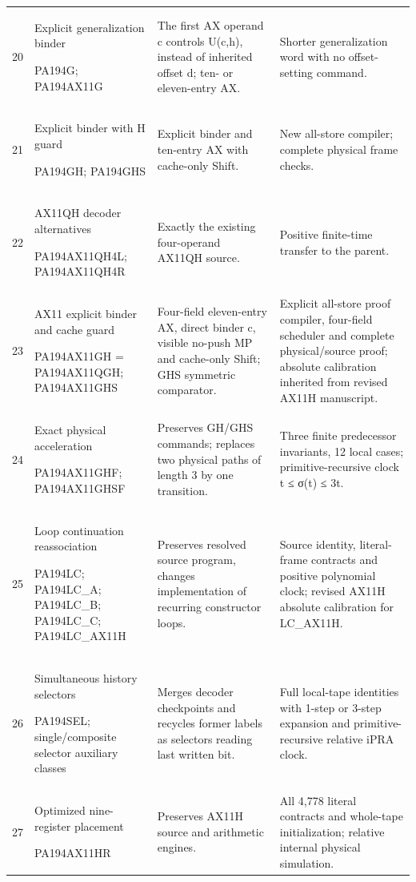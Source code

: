 \begin{longtable}{p{0.25in}>{\raggedright\arraybackslash}p{1.55in}>{\raggedright\arraybackslash}p{2.10in}>{\raggedright\arraybackslash}p{2.00in}}
20&Explicit generalization binder\par PA194G; PA194AX11G&The first AX operand c controls U(c,h), instead of inherited offset d; ten- or eleven-entry AX.&Shorter generalization word with no offset-setting command.\\[0.5em]
21&Explicit binder with H guard\par PA194GH; PA194GHS&Explicit binder and ten-entry AX with cache-only Shift.&New all-store compiler; complete physical frame checks.\\[0.5em]
22&AX11QH decoder alternatives\par PA194AX11QH4L; PA194AX11QH4R&Exactly the existing four-operand AX11QH source.&Positive finite-time transfer to the parent.\\[0.5em]
23&AX11 explicit binder and cache guard\par PA194AX11GH = PA194AX11QGH; PA194AX11GHS&Four-field eleven-entry AX, direct binder c, visible no-push MP and cache-only Shift; GHS symmetric comparator.&Explicit all-store proof compiler, four-field scheduler and complete physical/source proof; absolute calibration inherited from revised AX11H manuscript.\\[0.5em]
24&Exact physical acceleration\par PA194AX11GHF; PA194AX11GHSF&Preserves GH/GHS commands; replaces two physical paths of length 3 by one transition.&Three finite predecessor invariants, 12 local cases; primitive-recursive clock t ≤ σ(t) ≤ 3t.\\[0.5em]
25&Loop continuation reassociation\par PA194LC; PA194LC\_A; PA194LC\_B; PA194LC\_C; PA194LC\_AX11H&Preserves resolved source program, changes implementation of recurring constructor loops.&Source identity, literal-frame contracts and positive polynomial clock; revised AX11H absolute calibration for LC\_AX11H.\\[0.5em]
26&Simultaneous history selectors\par PA194SEL; single/composite selector auxiliary classes&Merges decoder checkpoints and recycles former labels as selectors reading last written bit.&Full local-tape identities with 1-step or 3-step expansion and primitive-recursive relative iPRA clock.\\[0.5em]
27&Optimized nine-register placement\par PA194AX11HR&Preserves AX11H source and arithmetic engines.&All 4,778 literal contracts and whole-tape initialization; relative internal physical simulation.\\[0.5em]

\end{longtable}

